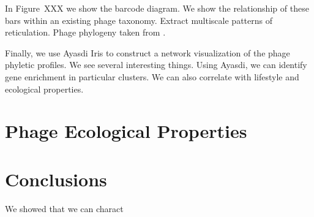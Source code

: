 In Figure~XXX we show the barcode diagram.
We show the relationship of these bars within an existing phage taxonomy.
Extract multiscale patterns of reticulation.
Phage phylogeny taken from \cite{Glazko:2007dc}.

Finally, we use Ayasdi Iris to construct a network visualization of the phage phyletic profiles.
We see several interesting things.
Using Ayasdi, we can identify gene enrichment in particular clusters.
We can also correlate with lifestyle and ecological properties.

\section{Phage Ecological Properties}
\label{phage:sec:ecological_properties}

\section{Conclusions}
\label{phage:sec:conclusions}

We showed that we can charact